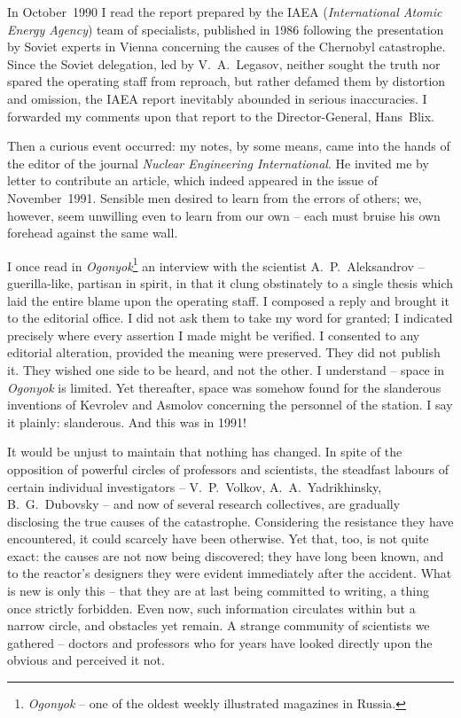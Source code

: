 \documentclass[openright]{bookest}
\begin{document}
In October~1990 I read the report prepared by the IAEA (\textit{International Atomic Energy Agency}) team of specialists, published in 1986 following the presentation by Soviet experts in Vienna concerning the causes of the Chernobyl catastrophe. Since the Soviet delegation, led by V.~A.~Legasov, neither sought the truth nor spared the operating staff from reproach, but rather defamed them by distortion and omission, the IAEA report inevitably abounded in serious inaccuracies. I forwarded my comments upon that report to the Director-General, Hans~Blix.

Then a curious event occurred: my notes, by some means, came into the hands of the editor of the journal \textit{Nuclear Engineering International}. He invited me by letter to contribute an article, which indeed appeared in the issue of November~1991. Sensible men desired to learn from the errors of others; we, however, seem unwilling even to learn from our own -- each must bruise his own forehead against the same wall.


I once read in \textit{Ogonyok}\footnote{\textit{Ogonyok} -- one of the oldest weekly illustrated magazines in Russia.} an interview with the scientist A.~P.~Aleksandrov -- guerilla-like, partisan in spirit, in that it clung obstinately to a single thesis which laid the entire blame upon the operating staff. I composed a reply and brought it to the editorial office. I did not ask them to take my word for granted; I indicated precisely where every assertion I made might be verified. I consented to any editorial alteration, provided the meaning were preserved. They did not publish it. They wished one side to be heard, and not the other. I understand -- space in \textit{Ogonyok} is limited. Yet thereafter, space was somehow found for the slanderous inventions of Kevrolev and Asmolov concerning the personnel of the station. I say it plainly: slanderous. And this was in 1991!

It would be unjust to maintain that nothing has changed. In spite of the opposition of powerful circles of professors and scientists, the steadfast labours of certain individual investigators -- V.~P.~Volkov, A.~A.~Yadrikhinsky, B.~G.~Dubovsky -- and now of several research collectives, are gradually disclosing the true causes of the catastrophe. Considering the resistance they have encountered, it could scarcely have been otherwise. Yet that, too, is not quite exact: the causes are not now being discovered; they have long been known, and to the reactor's designers they were evident immediately after the accident. What is new is only this -- that they are at last being committed to writing, a thing once strictly forbidden. Even now, such information circulates within but a narrow circle, and obstacles yet remain. A strange community of scientists we gathered -- doctors and professors who for years have looked directly upon the obvious and perceived it not.
\end{document}
